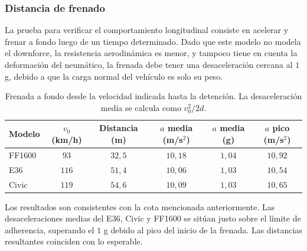 
\subsubsection{Distancia de frenado}

La prueba para verificar el comportamiento longitudinal consiste en acelerar y frenar a fondo luego de un tiempo determinado. Dado que este modelo no modela el downforce, la resistencia aerodinámica es menor, y tampoco tiene en cuenta la deformación del neumático, la frenada debe tener una desaceleración cercana al $1$ g, debido a que la carga normal del vehículo es solo su peso.

\begin{table}[H]
	\centering
	\begin{tabular}{lccccc}
		\hline
		Modelo & $v_0$ (km/h) & Distancia (m) & $a$ media (m/s$^2$) & $a$ media (g) & $a$ pico (m/s$^2$) \\
		\hline
		FF1600 & $93$  & $32{,}5$ & $10{,}18$ & $1{,}04$ & $10{,}92$ \\
		E36    & $116$ & $51{,}4$ & $10{,}06$ & $1{,}03$ & $10{,}54$ \\
		Civic  & $119$ & $54{,}6$ & $10{,}09$ & $1{,}03$ & $10{,}65$ \\
		\hline
	\end{tabular}
	\caption[Distancia de frenado]{Frenada a fondo desde la velocidad indicada hasta la detención. La desaceleración media se calcula como $v_0^2 / 2d$.}
	\label{tab:frenada}
\end{table}

Los resultados son consistentes con la cota mencionada anteriormente. Las desaceleraciones  medias del E36, Civic y FF1600 se sitúan justo sobre el límite de adherencia, superando el $1$ g debido al pico del inicio de la frenada. Las distancias resultantes coinciden con lo esperable.


